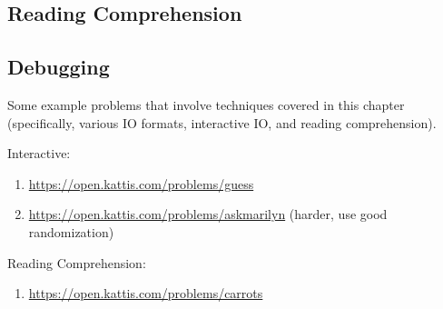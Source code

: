 \subsection{Reading Comprehension}

\subsection{Debugging}

\hrulefill

Some example problems that involve techniques covered in this chapter (specifically, various IO formats, interactive IO, and reading comprehension).


Interactive: 
\begin{enumerate}
\item \url{https://open.kattis.com/problems/guess}
\item \url{https://open.kattis.com/problems/askmarilyn} (harder, use good randomization)
\end{enumerate}

Reading Comprehension:
\begin{enumerate}
\item \url{https://open.kattis.com/problems/carrots}
\end{enumerate}